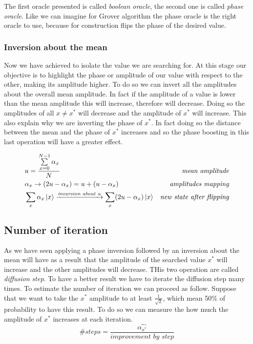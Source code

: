 \documentclass[main.tex]{subfiles}
\theoremstyle{definition}
\begin{document}
The first oracle presented is called \textit{boolean oracle}, the second one is called \textit{phase oracle}. Like we can imagine for Grover algorithm the phase oracle is the right oracle to use, because for construction flips the phase of the desired value.

\subsubsection{Inversion about the mean}
Now we have achieved to isolate the value we are searching for. At this stage our objective is to highlight the phase or amplitude of our value with respect to the other, making its amplitude
higher. To do so we can invert all the amplitudes about the overall mean amplitude. In fact if the amplitude of a value is lower than the mean amplitude this will increase, therefore will decrease. Doing so the amplitudes of all $x\neq x^*$ will decrease and the amplitude of $x^*$ will increase. This also explain why we are inverting the phase of $x^*$. In fact doing so the distance between the mean and the phase of $x^*$ increases and so the phase boosting in this last operation will have a greater effect.

\begin{align*}
& u=\frac{\sum\limits_{x=0}^{N-1}\alpha_x}{N}  &\textit{mean amplitude}\\
& \alpha_x \rightarrow (2u-\alpha_x)=u+(u-\alpha_x) &\textit{amplitudes mapping}\\
& \sum_{x}\alpha_{x}\ket{x} \xrightarrow{\textit{inversion about u}} \sum_{x}(2u-\alpha_x)\ket{x} &\textit{new state after flipping}
\end{align*}

\subsection{Number of iteration}
As we have seen applying a phase inversion followed by an inversion about the mean will have as a result that the amplitude of the searched value $x^*$ will increase and the other amplitudes will decrease. THis two operation are called \textit{diffusion step}.
To have a better result we have to iterate the diffusion step many times. To estimate the number of iteration we can proceed as follow. 
Suppose that we want to take the $x^*$ amplitude to at least $\frac{1}{\sqrt{2}}$, which mean 50\% of probability to have this result.
To do so we can measure the how much the amplitude of $x^*$ increases at each iteration.
$$\textit{\#steps}=\frac{\widehat{\alpha_{x^{*}}}}{\textit{improvement by step}}$$
\end{document}
